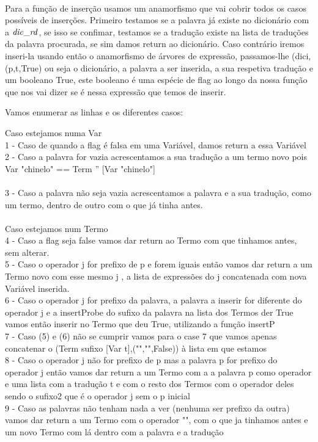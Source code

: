 \documentclass[a4paper]{article}
\newcommand{\Varid}[1]{\mathit{#1}}
\begin{document}
\\
\par Para a função de inserção usamos um anamorfismo que vai cobrir todos os casos possíveis de 
inserções.
Primeiro testamos se a palavra já existe no dicionário com a \ensuremath{\Varid{dic\char95 rd}}, se isso se confimar,
testamos se a tradução existe na lista de traduções da palavra procurada, se sim damos return ao dicionário.
Caso contrário iremos inseri-la usando então o anamorfismo de árvores de expressão, passamos-lhe (dici,(p,t,True)
ou seja o dicionário, a palavra a ser inserida, a sua respetiva tradução e um booleano True, este booleano é uma 
espécie de flag ao longo da nossa função que nos vai dizer se é nessa expressão que temos de inserir.


Vamos enumerar as linhas e os diferentes casos:

Caso estejamos numa Var
\\
1 - Caso de quando a flag é falsa em uma Variável, damos return a essa Variável
\\
2 - Caso a palavra for vazia acrescentamos a sua tradução a um termo novo pois 
Var "chinelo" == Term '' [Var "chinelo"]
\\
\\
3 - Caso a palavra não seja vazia acrescentamos a palavra e a sua tradução, como um termo, dentro de outro
com o que já tinha antes.
\\
\\
Caso estejamos num Termo
\\
4 - Caso a flag seja false vamos dar return ao Termo com que tinhamos antes, sem alterar.
\\
5 - Caso o operador j for prefixo de p e forem iguais então vamos dar return a um Termo novo com
esse mesmo j , a lista de expressões do j concatenada com nova Variável inserida.
\\
6 - Caso o operador j for prefixo da palavra, a palavra a inserir for diferente do operador j e 
a insertProbe do sufixo da palavra na lista dos Termos der True vamos então inserir no Termo que deu 
True, utilizando a função insertP
\\
7 - Caso (5) e (6) não se cumprir vamos para o case 7 que vamos apenas concatenar o 
(Term sufixo [Var t],("","",False)) à lista em que estamos
\\
8 - Caso o operador j não for prefixo de p mas a palavra p for prefixo do operador j então vamos dar return
a um Termo com a a palavra p como operador e uma lista com a tradução t e com o resto dos Termos com o operador
deles sendo o sufixo2 que é o operador j sem o p inicial
\\
9 - Caso as palavras não tenham nada a ver (nenhuma ser prefixo da outra) vamos dar return a um Termo com o operador "",
com o que ja tinhamos antes e um novo Termo com lá dentro com a palavra e a tradução
\end{document}
